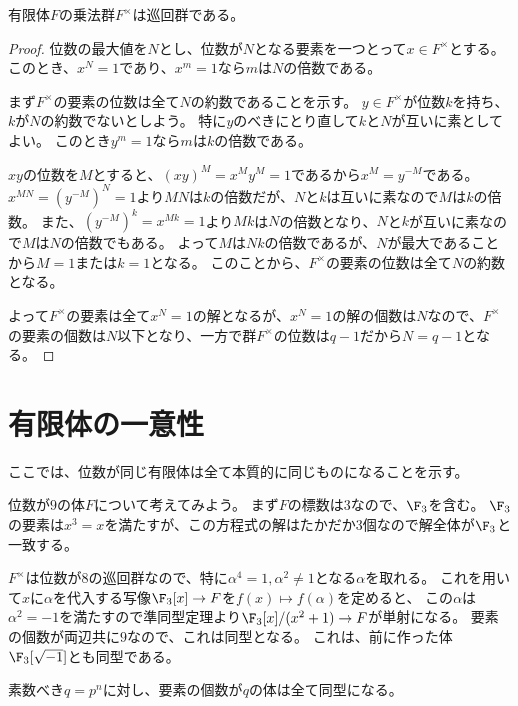 \documentclass[uplatex]{jsarticle}
\begin{document}
\begin{prop}
  有限体$F$の乗法群$F^\times$は巡回群である。
\end{prop}

\begin{proof}
  位数の最大値を$N$とし、位数が$N$となる要素を一つとって$x\in F^\times$とする。
  このとき、$x^N=1$であり、$x^m=1$なら$m$は$N$の倍数である。

  まず$F^\times$の要素の位数は全て$N$の約数であることを示す。
  $y\in F^\times$が位数$k$を持ち、$k$が$N$の約数でないとしよう。
  特に$y$のべきにとり直して$k$と$N$が互いに素としてよい。
  このとき$y^m=1$なら$m$は$k$の倍数である。

  $xy$の位数を$M$とすると、$(xy)^M=x^My^M=1$であるから$x^M=y^{-M}$である。
  $x^{MN}=(y^{-M})^N=1$より$MN$は$k$の倍数だが、$N$と$k$は互いに素なので$M$は$k$の倍数。
  また、$(y^{-M})^k=x^{Mk}=1$より$Mk$は$N$の倍数となり、$N$と$k$が互いに素なので$M$は$N$の倍数でもある。
  よって$M$は$Nk$の倍数であるが、$N$が最大であることから$M=1$または$k=1$となる。
  このことから、$F^\times$の要素の位数は全て$N$の約数となる。

  よって$F^\times$の要素は全て$x^N=1$の解となるが、$x^N=1$の解の個数は$N$なので、$F^\times$の要素の個数は$N$以下となり、一方で群$F^\times$の位数は$q-1$だから$N=q-1$となる。  
\end{proof}

\section{有限体の一意性}

ここでは、位数が同じ有限体は全て本質的に同じものになることを示す。

\begin{eg}
  位数が$9$の体$F$について考えてみよう。
  まず$F$の標数は$3$なので、$\F_3$を含む。
  $\F_3$の要素は$x^3=x$を満たすが、この方程式の解はたかだか$3$個なので解全体が$\F_3$と一致する。

  $F^\times$は位数が$8$の巡回群なので、特に$\alpha^4=1, \alpha^2\neq1$となる$\alpha$を取れる。
  これを用いて$x$に$\alpha$を代入する写像$\F_3[x]\to F$を$f(x)\mapsto f(\alpha)$を定めると、
  この$\alpha$は$\alpha^2=-1$を満たすので準同型定理より$\F_3[x]/(x^2+1)\to F$が単射になる。
  要素の個数が両辺共に$9$なので、これは同型となる。
  これは、前に作った体$\F_3[\sqrt{-1}]$とも同型である。
\end{eg}

\begin{prop}
  素数べき$q=p^n$に対し、要素の個数が$q$の体は全て同型になる。
\end{prop}
\end{document}
